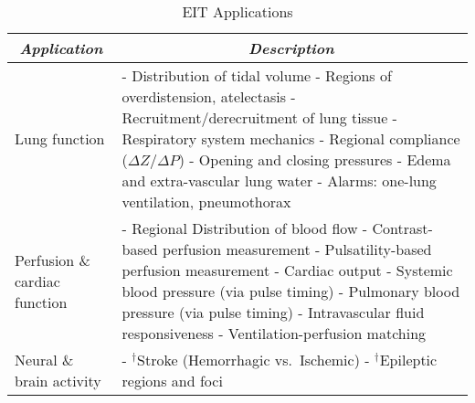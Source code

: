 \documentclass[10pt,journal]{IEEEtran}\def\TBLWIDA{15mm}\def\TBLWIDB{60mm}
\begin{document}
\begin{table}
\caption{EIT Applications}
\label{tbl:EIT_Applications}
\centering
\begin{tabular}{p{\TBLWIDA}p{\TBLWIDB}}
\multicolumn{1}{c}{\em Application} &
\multicolumn{1}{c}{\em Description} \\
\hline
Lung function &
 - Distribution of tidal volume \cite{Hahn1995Distribution}
      \newline
 - Regions of overdistension, atelectasis
                \cite{Gomez2012Overdistension, Costa2009Bedside}
      \newline
 - Recruitment/derecruitment of lung tissue \cite{Frerichs2003Regional}
      \newline
 - Respiratory system mechanics \cite{Pulletz2012Dynamics}
      \newline
 - Regional compliance ($\Delta Z/\Delta P$) 
      \newline
 - Opening and closing pressures \cite{Pulletz2012Opening}
      \newline
 - Edema and extra-vascular lung water \cite{Trepte2016Edema}
      \newline
 - Alarms: one-lung ventilation, pneumothorax 
\\
    \hline
Perfusion  \& \newline
cardiac \newline function & 
 - Regional Distribution of blood flow \cite{Smit2003Perfusion}
      \newline
 - Contrast-based perfusion measurement \cite{Frerichs2002Perfusion}
      \newline
 - Pulsatility-based perfusion measurement \cite{Smit2003Perfusion}
      \newline
 - Cardiac output 
      \newline
 - Systemic blood pressure  (via pulse timing) \cite{Sola2011Central}
      \newline
 - Pulmonary blood pressure (via pulse timing) \cite{Proenca2016Noninvasive}
      \newline
 - Intravascular fluid responsiveness \cite{Trepte2017StrokeVolume}
      \newline
 - Ventilation-perfusion matching 
\\
    \hline
Neural \& \newline
brain activity &
 - $^\dagger$Stroke (Hemorrhagic vs.\ Ischemic) \cite{Romsauerova2006mfEIT}
      \newline
 - $^\dagger$Epileptic regions and foci 
      \newline

\end{tabular}
\end{table}
\end{document}
